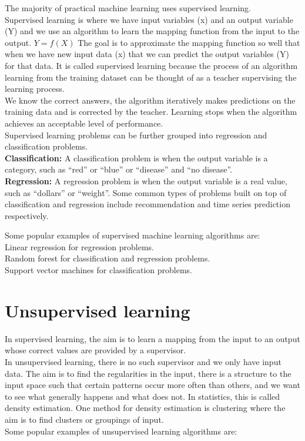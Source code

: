 The majority of practical machine learning uses supervised learning.\\
Supervised learning is where we have input variables (x) and an output variable (Y) and we use an algorithm to learn the mapping function from the input to the output.
\newline
$Y = f(X)$
\newline
The goal is to approximate the mapping function so well that when we have new input data (x) that we can predict the output variables (Y) for that data.
\newline
It is called supervised learning because the process of an algorithm learning from the training dataset can be thought of as a teacher supervising the learning process.\\ We know the correct answers, the algorithm iteratively makes predictions on the training data and is corrected by the teacher. Learning stops when the algorithm achieves an acceptable level of performance.\\
\newline
Supervised learning problems can be further grouped into regression and classification problems.\\
\newline
\textbf{Classification:} A classification problem is when the output variable is a category, such as “red” or “blue” or “disease” and “no disease”.\\ \textbf{Regression:}  A regression problem is when the output variable is a real value, such as “dollars” or “weight”.
Some common types of problems built on top of classification and regression include recommendation and time series prediction respectively.

Some popular examples of supervised machine learning algorithms are:\\

Linear regression for regression problems.\\

Random forest for classification and regression problems.\\

Support vector machines for classification problems.



\section{Unsupervised learning}

In supervised learning, the aim is to learn a mapping from the input to
an output whose correct values are provided by a supervisor.\\
In unsupervised
learning, there is no such supervisor and we only have input data.
The aim is to find the regularities in the input, there is a structure to the
input space such that certain patterns occur more often than others, and we want to see what generally happens and what does not. In statistics, this is called density estimation.
One method for density estimation is clustering where the aim is to
find clusters or groupings of input.\\ 
Some popular examples of unsupervised learning algorithms are:


